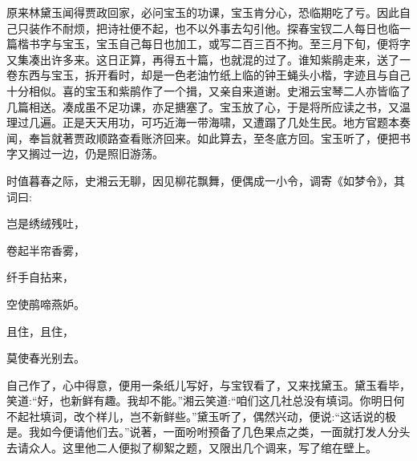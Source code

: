 \begin{parag}
    原来林黛玉闻得贾政回家，必问宝玉的功课，宝玉肯分心，恐临期吃了亏。因此自己只装作不耐烦，把诗社便不起，也不以外事去勾引他。探春宝钗二人每日也临一篇楷书字与宝玉，宝玉自己每日也加工，或写二百三百不拘。至三月下旬，便将字又集凑出许多来。这日正算，再得五十篇，也就混的过了。谁知紫鹃走来，送了一卷东西与宝玉，拆开看时，却是一色老油竹纸上临的钟王蝇头小楷，字迹且与自己十分相似。喜的宝玉和紫鹃作了一个揖，又亲自来道谢。史湘云宝琴二人亦皆临了几篇相送。凑成虽不足功课，亦足搪塞了。宝玉放了心，于是将所应读之书，又温理过几遍。正是天天用功，可巧近海一带海啸，又遭蹋了几处生民。地方官题本奏闻，奉旨就著贾政顺路查看账济回来。如此算去，至冬底方回。宝玉听了，便把书字又搁过一边，仍是照旧游荡。
\end{parag}


\begin{parag}
    时值暮春之际，史湘云无聊，因见柳花飘舞，便偶成一小令，调寄《如梦令》，其词曰:
\end{parag}


\begin{poem}
    \begin{pl}岂是绣绒残吐，\end{pl}

    \begin{pl}卷起半帘香雾，\end{pl}

    \begin{pl}纤手自拈来，\end{pl}

    \begin{pl}空使鹃啼燕妒。\end{pl}

    \begin{pl}且住，且住，\end{pl}

    \begin{pl}莫使春光别去。\end{pl}


\end{poem}


\begin{parag}
    自己作了，心中得意，便用一条纸儿写好，与宝钗看了，又来找黛玉。黛玉看毕，笑道:“好，也新鲜有趣。我却不能。”湘云笑道:“咱们这几社总没有填词。你明日何不起社填词，改个样儿，岂不新鲜些。”黛玉听了，偶然兴动，便说:“这话说的极是。我如今便请他们去。”说著，一面吩咐预备了几色果点之类，一面就打发人分头去请众人。这里他二人便拟了柳絮之题，又限出几个调来，写了绾在壁上。
\end{parag}


